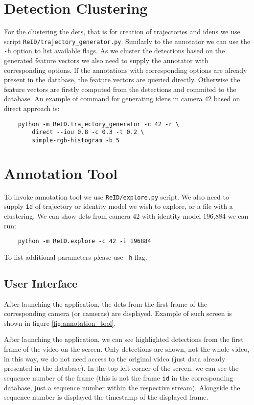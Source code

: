\section{Detection Clustering}

For the clustering the \glspl{det}, that is for creation of trajectories and \glspl{iden} we use script \texttt{ReID/trajectory\_generator.py}. Similarly to the annotator we can use the \verb+-h+ option to list available flags. As we cluster the detections based on the generated feature vectors we also need to supply the annotator with corresponding options. If the annotations with corresponding options are already present in the database, the feature vectors are queried directly. Otherwise the feature vectors are firstly computed from the detections and commited to the database. An example of command for generating \glspl{iden} in camera 42 based on direct approach is:

\begin{verbatim}
    python -m ReID.trajectory_generator -c 42 -r \
        direct --iou 0.8 -c 0.3 -t 0.2 \
        simple-rgb-histogram -b 5
\end{verbatim}


\section{Annotation Tool}

To invoke annotation tool we use \texttt{ReID/explore.py} script. We also need to supply \verb+id+ of trajectory or identity model we wish to explore, or a file with a clustering. We can show \glspl{det} from camera 42 with identity model 196,884 we can run:

\begin{verbatim}
    python -m ReID.explore -c 42 -i 196884
\end{verbatim}

To list additional parameters please use \verb+-h+ flag.

\subsection{User Interface}

After launching the application, the \glspl{det} from the first frame of the corresponding camera (or cameras) are displayed. Example of such screen is shown in figure \ref{fig:annotation_tool}.

After launching the application, we can see highlighted detections from
the first frame of the video on the screen.
Only detections are shown, not the whole video, in this way, we do not need access
to the original video (just data already presented in the database). In the top left corner
of the screen, we can see the sequence number of the frame (this is not the frame \verb+id+
in the corresponding database, just a sequence number within the respective stream). Alongside
the sequence number is displayed the timestamp of the displayed frame.

